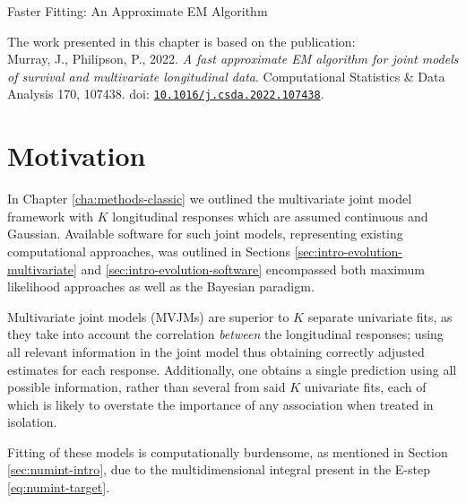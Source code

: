 \begin{chapter}{\label{cha:approx}Faster Fitting: An Approximate EM Algorithm}
\vfill
\begin{center}
    \begin{bluebox}
    The work presented in this chapter is based on the publication:\\Murray, J., Philipson, P., 2022. \textit{A fast approximate EM algorithm for joint models of survival and multivariate longitudinal data}. Computational Statistics \& Data Analysis 170, 107438. doi: \href{https://doi.org/10.1016/j.csda.2022.107438}{\tt{10.1016/j.csda.2022.107438}}.
    \end{bluebox}
\end{center}
\vfill
\clearpage
\section{Motivation}
In Chapter \ref{cha:methods-classic} we outlined the multivariate joint model framework with $K$ longitudinal responses which are assumed continuous and Gaussian. Available software for such joint models, representing existing computational approaches, was outlined in Sections \ref{sec:intro-evolution-multivariate} and \ref{sec:intro-evolution-software} encompassed both maximum likelihood approaches as well as the Bayesian paradigm.

Multivariate joint models (MVJMs) are superior to $K$ separate univariate fits, as they take into account the correlation \textit{between} the longitudinal responses; using all relevant information in the joint model thus obtaining correctly adjusted estimates for each response. Additionally, one obtains a single prediction using all possible information, rather than several from said $K$ univariate fits, each of which is likely to overstate the importance of any association when treated in isolation.

Fitting of these models is computationally burdensome, as mentioned in Section \ref{sec:numint-intro}, due to the multidimensional integral present in the E-step \eqref{eq:numint-target}.


\end{chapter}
